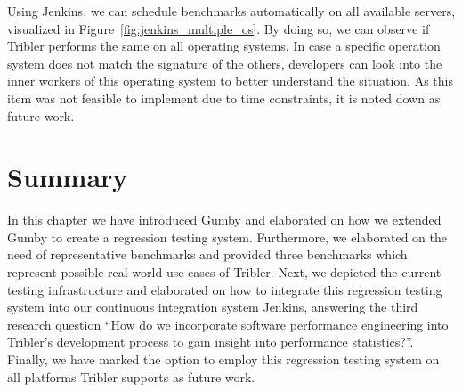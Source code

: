 Using Jenkins, we can schedule benchmarks automatically on all available servers, visualized in Figure~\ref{fig:jenkins_multiple_os}.
By doing so, we can observe if Tribler performs the same on all operating systems.
In case a specific operation system does not match the signature of the others, developers can look into the inner workers of this operating system to better understand the situation.
As this item was not feasible to implement due to time constraints, it is noted down as future work.

\section{Summary}

In this chapter we have introduced Gumby and elaborated on how we extended Gumby to create a regression testing system.
Furthermore, we elaborated on the need of representative benchmarks and provided three benchmarks which represent possible real-world use cases of Tribler.
Next, we depicted the current testing infrastructure and elaborated on how to integrate this regression testing system into our continuous integration system Jenkins, answering the third research question \enquote{How do we incorporate software performance engineering into Tribler's development process to gain insight into performance statistics?}.
Finally, we have marked the option to employ this regression testing system on all platforms Tribler supports as future work.
